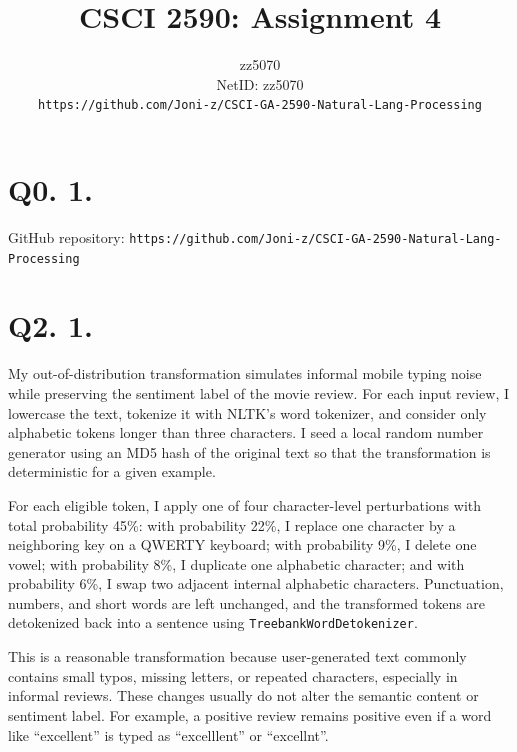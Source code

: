 \documentclass{article}
\title{CSCI 2590: Assignment 4}
\author{zz5070 \\ NetID: zz5070 \\ \texttt{https://github.com/Joni-z/CSCI-GA-2590-Natural-Lang-Processing}}
\date{}
\begin{document}
\maketitle

\section*{Q0. 1.}
GitHub repository: \texttt{https://github.com/Joni-z/CSCI-GA-2590-Natural-Lang-Processing}

\section*{Q2. 1.}
My out-of-distribution transformation simulates informal mobile typing noise while preserving the sentiment label of the movie review. For each input review, I lowercase the text, tokenize it with NLTK's word tokenizer, and consider only alphabetic tokens longer than three characters. I seed a local random number generator using an MD5 hash of the original text so that the transformation is deterministic for a given example.

For each eligible token, I apply one of four character-level perturbations with total probability 45\%: with probability 22\%, I replace one character by a neighboring key on a QWERTY keyboard; with probability 9\%, I delete one vowel; with probability 8\%, I duplicate one alphabetic character; and with probability 6\%, I swap two adjacent internal alphabetic characters. Punctuation, numbers, and short words are left unchanged, and the transformed tokens are detokenized back into a sentence using \texttt{TreebankWordDetokenizer}.

This is a reasonable transformation because user-generated text commonly contains small typos, missing letters, or repeated characters, especially in informal reviews. These changes usually do not alter the semantic content or sentiment label. For example, a positive review remains positive even if a word like ``excellent'' is typed as ``excelllent'' or ``excellnt''.
\end{document}
